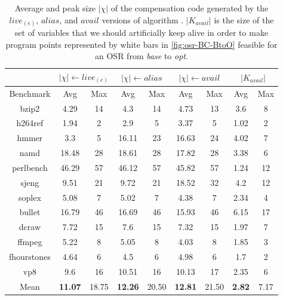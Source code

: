\begin{table}[!ht]
\begin{center}
\begin{small}
\begin{tabular}{ |c|c|c|c|c|c|c|c|c| }
\cline{2-9}
\multicolumn{1}{l|}{} & \multicolumn{2}{c|}{$|\chi|\leftarrow live_{(e)}$} & \multicolumn{2}{c|}{$|\chi|\leftarrow alias$} & \multicolumn{2}{c|}{$|\chi|\leftarrow avail$} & \multicolumn{2}{c|}{$|K_{avail}|$} \\
\hline
Benchmark & Avg & Max & Avg & Max & Avg & Max & Avg & Max \\
\hline
\hline
bzip2 & 4.29 & 14 & 4.3 & 14 & 4.73 & 13 & 3.6 & 8 \\
\hline
h264ref & 1.94 & 2 & 2.9 & 5 & 3.37 & 5 & 1.02 & 2 \\
\hline
hmmer & 3.3 & 5 & 16.11 & 23 & 16.63 & 24 & 4.02 & 7 \\
\hline
namd & 18.48 & 28 & 18.61 & 28 & 17.82 & 28 & 3.38 & 6 \\
\hline
perlbench & 46.29 & 57 & 46.12 & 57 & 45.82 & 57 & 1.24 & 12 \\
\hline
sjeng & 9.51 & 21 & 9.72 & 21 & 18.52 & 32 & 4.2 & 12 \\
\hline
soplex & 5.08 & 7 & 5.02 & 7 & 4.38 & 7 & 2.34 & 4 \\
\hline
bullet & 16.79 & 46 & 16.69 & 46 & 15.93 & 46 & 6.15 & 17 \\
\hline
dcraw & 7.72 & 15 & 7.6 & 15 & 7.32 & 15 & 1.97 & 7 \\
\hline
ffmpeg & 5.22 & 8 & 5.05 & 8 & 4.03 & 8 & 1.85 & 3 \\
\hline
fhourstones & 4.64 & 6 & 4.5 & 6 & 4.98 & 6 & 1.7 & 2 \\
\hline
vp8 & 9.6 & 16 & 10.51 & 16 & 10.13 & 17 & 2.35 & 6 \\
\hline
\hline
Mean & {\bf 11.07} & 18.75 & {\bf 12.26} & 20.50 & {\bf 12.81} & 21.50 & {\bf 2.82} & 7.17 \\
\hline
\end{tabular}
\end{small}
\end{center}
\caption{\label{tab:OSR-alC-prologue-BtoO} Average and peak size $|\chi|$ of the compensation code generated by the $live_{(e)}$, $alias$, and $avail$ versions of algorithm \reconstruct. $|K_{avail}|$ is the size of the set of variables that we should artificially keep alive in order to make program points represented by white bars in \myfigure\ref{fig:osr-BC-BtoO} feasible for an OSR from {\em base} to {\em opt}.}
\end{table}


